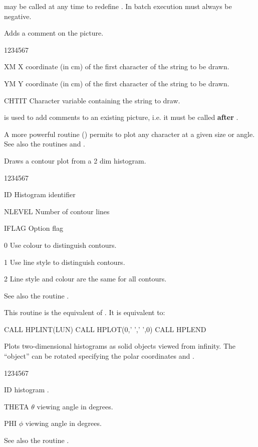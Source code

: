  may be called at any time to redefine . In batch
execution  must always be negative.


\Action
Adds a comment on the picture.
\Pdesc
\begin{DLtt}{1234567}
\item[XM]    X coordinate (in cm) of the first character of the string to be
             drawn.
\item[YM]    Y coordinate (in cm) of the first character of the string to be
             drawn.
\item[CHTIT] Character variable containing the string to draw.
\end{DLtt}
 is used to add comments to an existing picture, i.e. it must be
called {\bf  after} .

A more powerful routine () permits to plot any character at a given
size or angle. See also the \HIGZ{} routines  and .


\Action
Draws a contour plot from a 2 dim histogram.
\Pdesc
\begin{DLtt}{1234567}
\item[ID]     Histogram identifier
\item[NLEVEL] Number of contour lines
\item[IFLAG]  Option flag
\begin{DLtt}{12}
   \item[0] Use colour to distinguish contours.
   \item[1] Use line style to distinguish contours.
   \item[2] Line style and colour are the same for all contours.
\end{DLtt}
\end{DLtt}
See also the routine .


\Action
This routine is the  equivalent of .  It is equivalent
to:
\begin{XMP}
      CALL HPLINT(LUN)
      CALL HPLOT(0,' ',' ',0)
      CALL HPLEND
\end{XMP}


\Action
Plots two-dimensional histograms as solid objects viewed from infinity. The
``object'' can be rotated specifying the polar coordinates  and
.
\Pdesc
\begin{DLtt}{1234567}
\item[ID]    histogram .
\item[THETA] $\theta$ viewing angle in degrees.
\item[PHI]   $\phi$ viewing angle in degrees.
\end{DLtt}
See also the routine .


